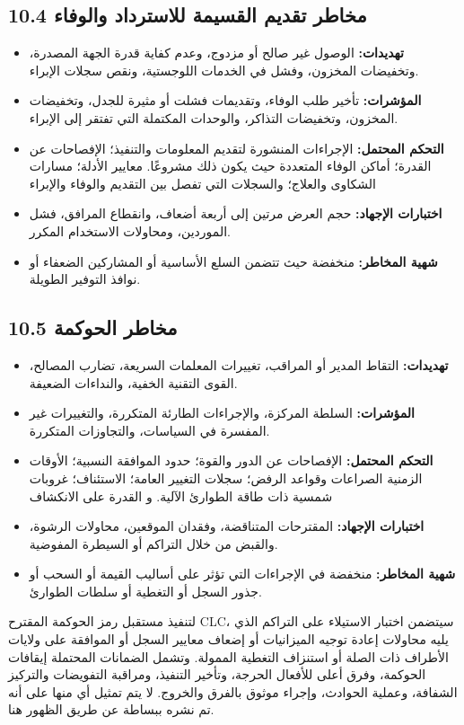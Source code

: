 \documentclass[11pt]{article}
\begin{document}
\subsection*{10.4 مخاطر تقديم القسيمة للاسترداد والوفاء}

\begin{itemize}[leftmargin=*]
\item \textbf{تهديدات:} الوصول غير صالح أو مزدوج، وعدم كفاية قدرة الجهة المصدرة، وتخفيضات المخزون، وفشل في الخدمات اللوجستية، ونقص سجلات الإبراء.
\item \textbf{المؤشرات:} تأخير طلب الوفاء، وتقديمات فشلت أو مثيرة للجدل، وتخفيضات المخزون، وتخفيضات التذاكر، والوحدات المكتملة التي تفتقر إلى الإبراء.
\item \textbf{التحكم المحتمل:} الإجراءات المنشورة لتقديم المعلومات والتنفيذ؛ الإفصاحات عن القدرة؛ أماكن الوفاء المتعددة حيث يكون ذلك مشروعًا. معايير الأدلة؛ مسارات الشكاوى والعلاج؛ والسجلات التي تفصل بين التقديم والوفاء والإبراء
\item \textbf{اختبارات الإجهاد:} حجم العرض مرتين إلى أربعة أضعاف، وانقطاع المرافق، فشل الموردين، ومحاولات الاستخدام المكرر.
\item \textbf{شهية المخاطر:} منخفضة حيث تتضمن السلع الأساسية أو المشاركين الضعفاء أو نوافذ التوفير الطويلة.
\end{itemize}
\subsection*{10.5 مخاطر الحوكمة}

\begin{itemize}[leftmargin=*]
\item \textbf{تهديدات:} التقاط المدير أو المراقب، تغييرات المعلمات السريعة، تضارب المصالح، القوى التقنية الخفية، والنداءات الضعيفة.
\item \textbf{المؤشرات:} السلطة المركزة، والإجراءات الطارئة المتكررة، والتغييرات غير المفسرة في السياسات، والتجاوزات المتكررة.
\item \textbf{التحكم المحتمل:} الإفصاحات عن الدور والقوة؛ حدود الموافقة النسبية؛ الأوقات الزمنية الصراعات وقواعد الرفض؛ سجلات التغيير العامة؛ الاستئناف؛ غروبات شمسية ذات طاقة الطوارئ الآلية. و القدرة على الانكشاف
\item \textbf{اختبارات الإجهاد:} المقترحات المتناقضة، وفقدان الموقعين، محاولات الرشوة، والقبض من خلال التراكم أو السيطرة المفوضية.
\item \textbf{شهية المخاطر:} منخفضة في الإجراءات التي تؤثر على أساليب القيمة أو السحب أو جذور السجل أو التغطية أو سلطات الطوارئ.
\end{itemize}
لتنفيذ مستقبل رمز الحوكمة المقترح CLC، سيتضمن اختبار الاستيلاء على التراكم الذي يليه محاولات إعادة توجيه الميزانيات أو إضعاف معايير السجل أو الموافقة على ولايات الأطراف ذات الصلة أو استنزاف التغطية الممولة. وتشمل الضمانات المحتملة إيقافات الحوكمة، وفرق أعلى للأفعال الحرجة، وتأخير التنفيذ، ومراقبة التفويضات والتركيز الشفافة، وعملية الحوادث، وإجراء موثوق بالفرق والخروج. لا يتم تمثيل أي منها على أنه تم نشره ببساطة عن طريق الظهور هنا.
\end{document}
